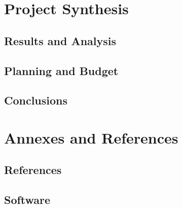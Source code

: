 \documentclass{legrand}
\begin{document}
\part{Project Synthesis}

\chapter{Results and Analysis}
\label{chapter:results}


\chapter{Planning and Budget}
\label{chapter:planning}


\chapter{Conclusions}
\label{chapter:conclusions}


\part{Annexes and References}

\chapter{References} %
\printbibliography[heading=bibempty]


\appendix
\chapter{Software}

\end{document}
